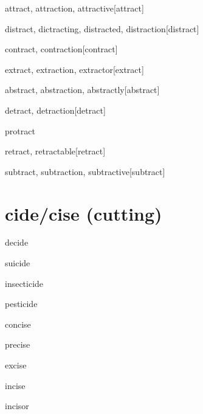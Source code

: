 \begin{wordRef}{attract, attraction, attractive}[attract]
\end{wordRef}

\begin{wordRef}{distract, dictracting, distracted, distraction}[distract]
\end{wordRef}

\begin{wordRef}{contract, contraction}[contract]
\end{wordRef}

\begin{wordRef}{extract, extraction, extractor}[extract]
\end{wordRef}

\begin{wordRef}{abstract, abstraction, abstractly}[abstract]
\end{wordRef}

\begin{wordRef}{detract, detraction}[detract]
\end{wordRef}

\begin{wordRef}{protract} 
\end{wordRef}

\begin{wordRef}{retract, retractable}[retract]
\end{wordRef}

\begin{wordRef}{subtract, subtraction, subtractive}[subtract]
\end{wordRef}

\section{cide/cise (cutting)}

\begin{wordRef}{decide}
\end{wordRef}

\begin{wordRef}{suicide}
\end{wordRef}

\begin{wordRef}{insecticide}
\end{wordRef}

\begin{wordRef}{pesticide}
\end{wordRef}

\begin{wordRef}{concise}
\end{wordRef}

\begin{wordRef}{precise}
\end{wordRef}

\begin{wordRef}{excise}
\end{wordRef}

\begin{wordRef}{incise}
\end{wordRef}

\begin{wordRef}{incisor}
\end{wordRef}





